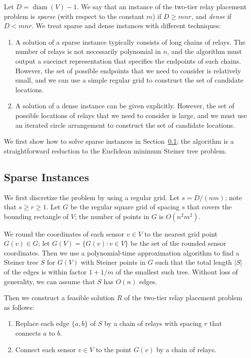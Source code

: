 \documentclass[11pt,a4paper]{article}
\newcommand{\s}[1]{{\lvert #1 \rvert}}
\DeclareMathOperator{\diam}{diam}
\theoremstyle{definition}
\theoremstyle{remark}
\begin{document}
Let $D = \diam(V) - 1$. We say that an instance of the two-tier relay placement problem is \emph{sparse} (with respect to the constant $m$) if $D \ge mnr$, and \emph{dense} if $D < mnr$.  We treat sparse and dense instances with different techniques:
\begin{enumerate}[label=(\roman*)]
    \item A solution of a sparse instance typically consists of long chains of relays. The number of relays is not necessarily polynomial in $n$, and the algorithm must output a succinct representation that specifies the endpoints of such chains. However, the set of possible endpoints that we need to consider is relatively small, and we can use a simple regular grid to construct the set of candidate locations.
    \item A solution of a dense instance can be given explicitly. However, the set of possible locations of relays that we need to consider is large, and we must use an iterated circle arrangement to construct the set of candidate locations.
\end{enumerate}

We first show how to solve sparse instances in Section~\ref{sec_ptas_sparse}; the algorithm is a straightforward reduction to the Euclidean minimum Steiner tree problem.

\subsection{Sparse Instances}\label{sec_ptas_sparse}

We first discretize the problem by using a regular grid. Let $s = D/(nm)$; note that $s \ge r \ge 1$. Let $G$ be the regular square grid of spacing $s$ that covers the bounding rectangle of $V$; the number of points in $G$ is $O(n^2m^2)$.

We round the coordinates of each sensor $v \in V$ to the nearest grid point $G(v) \in G$; let $G(V) = \{ G(v) : v \in V \}$ be the set of the rounded sensor coordinates. Then we use a polynomial-time approximation algorithm \cite{arora98ptas,mitchell99guillotine} to find a Steiner tree $S$ for $G(V)$ with Steiner points in $G$ such that the total length $\s{S}$ of the edges is within factor ${1+1/m}$ of the smallest such tree. Without loss of generality, we can assume that $S$ has $O(n)$ edges.

Then we construct a feasible solution $R$ of the two-tier relay placement problem as follows:
\begin{enumerate}[label=(\roman*)]
    \item Replace each edge $\{a,b\}$ of $S$ by a chain of relays with spacing $r$ that connects $a$ to $b$.
    \item Connect each sensor $v \in V$ to the point $G(v)$ by a chain of relays.
\end{enumerate}
\end{document}
